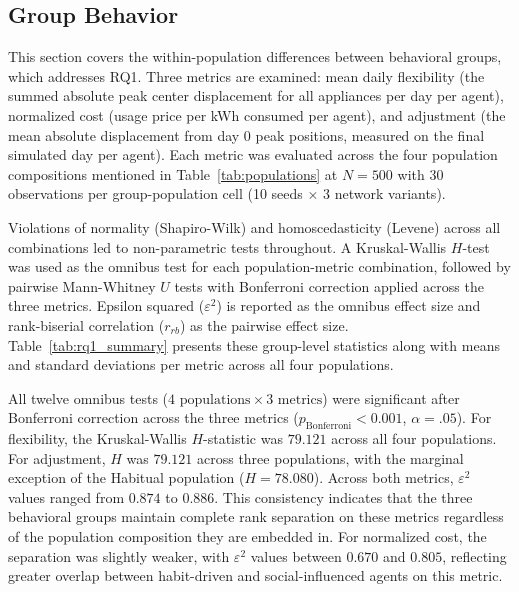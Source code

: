 \documentclass[11pt, a4paper]{article}
\begin{document}
\subsection{Group Behavior} \label{subs:rq1}

This section covers the within-population differences between behavioral groups, which addresses RQ1. Three metrics are examined: mean daily flexibility (the summed absolute peak center displacement for all appliances per day per agent), normalized cost (usage price per kWh consumed per agent), and adjustment (the mean absolute displacement from day 0 peak positions, measured on the final simulated day per agent). Each metric was evaluated across the four population compositions mentioned in Table~\ref{tab:populations} at $N = 500$ with 30 observations per group-population cell (10 seeds $\times$ 3 network variants).

Violations of normality (Shapiro-Wilk) and homoscedasticity (Levene) across all combinations led to non-parametric tests throughout. A Kruskal-Wallis $H$-test was used as the omnibus test for each population-metric combination, followed by pairwise Mann-Whitney $U$ tests with Bonferroni correction applied across the three metrics. Epsilon squared ($\varepsilon^2$) is reported as the omnibus effect size and rank-biserial correlation ($r_{rb}$) as the pairwise effect size. Table~\ref{tab:rq1_summary} presents these group-level statistics along with means and standard deviations per metric across all four populations. 

All twelve omnibus tests ($4 \text{ populations} \times 3 \text{ metrics}$) were significant after Bonferroni correction across the three metrics ($p_{\text{Bonferroni}} < 0.001$, $\alpha = .05$). For flexibility, the Kruskal-Wallis $H$-statistic was $79.121$ across all four populations. For adjustment, $H$ was $79.121$ across three populations, with the marginal exception of the Habitual population ($H = 78.080$). Across both metrics, $\varepsilon^2$ values ranged from $0.874$ to $0.886$. This consistency indicates that the three behavioral groups maintain complete rank separation on these metrics regardless of the population composition they are embedded in. For normalized cost, the separation was slightly weaker, with $\varepsilon^2$ values between $0.670$ and $0.805$, reflecting greater overlap between habit-driven and social-influenced agents on this metric.
\end{document}
